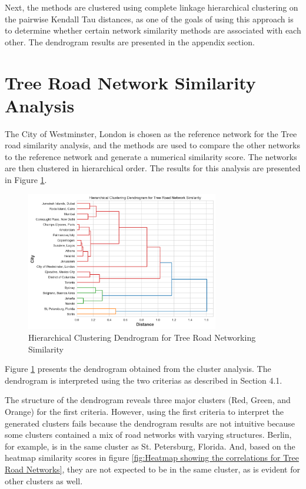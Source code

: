 Next, the methods are clustered using complete linkage hierarchical clustering on the pairwise Kendall Tau distances, as one of the goals of using this approach is to determine whether certain network similarity methods are associated with each other. The dendrogram results are presented in the appendix section.


\section{Tree Road Network Similarity Analysis}

The City of Westminster, London is chosen as the reference network for the Tree road similarity analysis, and the methods are used to compare the other networks to the reference network and generate a numerical similarity score. The networks are then clustered in hierarchical order. The results for this analysis are presented in Figure \ref{fig:Hierarchical Clustering Dendrogram for Tree Road Networking Similarity}.

\begin{figure}[!ht]
\centering
\includegraphics[width=0.75\textwidth,center]{picture/Tree/tree_dendrogram2.png}
\caption[Hierarchical Clustering Dendrogram for Tree Road Networking Similarity]{Hierarchical Clustering Dendrogram for Tree Road Networking Similarity}
\label{fig:Hierarchical Clustering Dendrogram for Tree Road Networking Similarity}
\end{figure}

Figure \ref{fig:Hierarchical Clustering Dendrogram for Tree Road Networking Similarity} presents the dendrogram obtained from the cluster analysis. The dendrogram is interpreted using the two criterias as described in Section 4.1.

The structure of the dendrogram reveals three major clusters (Red, Green, and Orange) for the first criteria. However, using the first criteria to interpret the generated clusters fails because the dendrogram results are not intuitive because some clusters contained a mix of road networks with varying structures. Berlin, for example, is in the same cluster as St. Petersburg, Florida. And, based on the heatmap similarity scores in figure \ref{fig:Heatmap showing the correlations for Tree Road Networks}, they are not expected to be in the same cluster, as is evident for other clusters as well.

